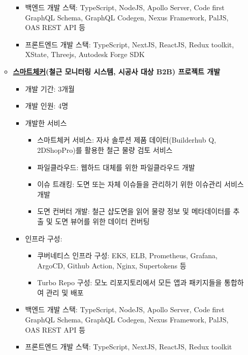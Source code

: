 \begin{itemize}[label=]
\begin{itemize}[label=]
\begin{itemize}[label=]
\begin{itemize}
			                  \end{itemize}
			            \item 백엔드 개발 스택: TypeScript, NodeJS, Apollo Server, Code first GraphQL Schema, GraphQL Codegen, Nexus Framework, PalJS, OAS REST API 등
			            \item 프론트엔드 개발 스택: TypeScript, NextJS, ReactJS, Redux toolkit, XState, Threejs, Autodesk Forge SDK
		            \end{itemize}
		      \item \textbf{\href{https://check.builderhub.io/signin}{스마트체커}(철근 모니터링 시스템, 시공사 대상 B2B) 프로젝트 개발}
		            \begin{itemize}[label=]
			            \item 개발 기간: 3개월
			            \item 개발 인원: 4명
			            \item 개발한 서비스
			                  \begin{itemize}
				                  \item 스마트체커 서비스: 자사 솔루션 제품 데이터(Builderhub Q, 2DShopPro)를 활용한 철근 물량 검토 서비스
				                  \item 파일클라우드: 웹하드 대체를 위한 파일클라우드 개발
				                  \item 이슈 트래킹: 도면 또는 자체 이슈들을 관리하기 위한 이슈관리 서비스 개발
				                  \item 도면 컨버터 개발: 철근 샵도면을 읽어 물량 정보 및 메타데이터를 추출 및 도면 뷰어를 위한 데이터 컨버팅
			                  \end{itemize}
			            \item 인프라 구성:
			                  \begin{itemize}
				                  \item 쿠버네티스 인프라 구성: EKS, ELB, Prometheus, Grafana, ArgoCD, Github Action, Nginx, Supertokens 등
				                  \item Turbo Repo 구성: 모노 리포지토리에서 모든 앱과 패키지들을 통합하여 관리 및 배포
			                  \end{itemize}
			            \item 백엔드 개발 스택: TypeScript, NodeJS, Apollo Server, Code first GraphQL Schema, GraphQL Codegen, Nexus Framework, PalJS, OAS REST API 등
			            \item 프론트엔드 개발 스택: TypeScript, NextJS, ReactJS, Redux toolkit

\end{itemize}
\end{itemize}
\end{itemize}

